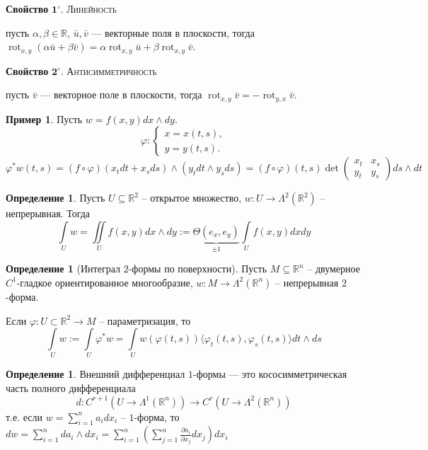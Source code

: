 \documentclass[a5paper]{article}
\newcounter{through}
\theoremstyle{plain}
\theoremstyle{definition}
\newtheorem{definition}[through]{Определение}
\newtheorem{example}[through]{Пример}
\numberwithin{through}{section}
\numberwithin{equation}{section}
\DeclareMathOperator{\rot}{rot}
\begin{document}
\medskip
{\bf Свойство} $\mathbf{1^\circ.}$
{\textsc{Линейность}}

 пусть $\alpha, \beta \in \mathbb{R}$, $\bar{u}, \bar{v}$ --- векторные поля в плоскости,
	тогда
	$\rot_{x, y} (\alpha\bar{u} + \beta\bar{v}) = \alpha\rot_{x,y} \bar{u} + \beta\rot_{x, y} \bar{v}$.
	
\medskip
{\bf Свойство} $\mathbf{2^\circ.}$
{\textsc{Антисимметричность}}

	пусть $\bar{v}$ --- векторное поле в плоскости,
	тогда $\rot_{x,y} \bar{v} = - \rot_{y, x} \bar{v}$.
	



\begin{example}
	Пусть $w = f(x, y) dx\wedge dy$.
	\[ \varphi:
	\begin{cases}
	x = x(t, s), \\
	y = y(t, s).
	\end{cases} \]
	$\varphi^* w(t, s) = (f \circ \varphi)(x_tdt + x_sds) \wedge (y_tdt \wedge y_sds) = 
	(f \circ \varphi)(t, s) \det 
	\begin{pmatrix}
	x_t & x_s \\
	y_t & y_s
	\end{pmatrix}
	ds \wedge dt$
\end{example}

\begin{definition}
	Пусть $U \subseteq \mathbb{R}^2$ -- открытое множество, $w: U \to \Lambda^2(\mathbb{R}^2)$ -- непрерывная. Тогда
	\[ \int\limits_U w = \iint\limits_U f(x, y) dx \wedge dy := \underbrace{\Theta(e_x, e_y)}_{\pm 1} \int\limits_U f(x, y) dxdy \]
\end{definition}

\begin{definition}[Интеграл $2$-формы по поверхности]
	Пусть $M \subseteq \mathbb{R}^n$ -- двумерное $C^1$-гладкое ориентированное многообразие,
	$w: M \to \Lambda^2(\mathbb{R}^n)$ -- непрерывная $2$-форма.
	
	Если $\varphi : U \subset \mathbb{R}^2 \to M$ -- параметризация, то 
	\[ \int\limits_U w := \int\limits_U \varphi^* w = 
	\int\limits_U w(\varphi(t,s)) \langle \varphi_t (t,s), \varphi_s (t,s) \rangle dt \wedge ds \]
\end{definition}

\begin{definition}
	Внешний дифференциал $1$-формы --- это кососимметрическая часть полного дифференциала
	\[ d: C^{r+1}(U \to \Lambda^1(\mathbb{R}^n)) \to  C^{r}(U \to \Lambda^2(\mathbb{R}^n)) \]
	т.е. если $w = \sum\limits_{ i =1 }^{n} a_i dx_i$ -- $1$-форма, то $dw = 
	\sum\limits_{ i =1 }^{n} da_i\wedge dx_i = \sum\limits_{ i =1 }^{n} 
	\left(\sum\limits_{ j =1 }^{n} \frac{\partial a_i}{\partial x_j}  dx_j \right) dx_i $
\end{definition}
\end{document}
